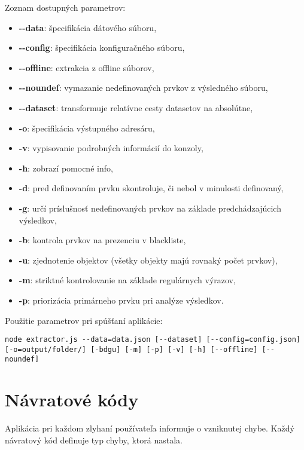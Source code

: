 Zoznam dostupných parametrov:

\begin{itemize}
    \item \textbf{-{}-data}: špecifikácia dátového súboru,
    \item \textbf{-{}-config}: špecifikácia konfiguračného súboru,
    \item \textbf{-{}-offline}: extrakcia z offline súborov,
    \item \textbf{-{}-noundef}: vymazanie nedefinovaných prvkov z výsledného súboru,
    \item \textbf{-{}-dataset}: transformuje relatívne cesty datasetov na absolútne,
    \item \textbf{-o}: špecifikácia výstupného adresáru,
    \item \textbf{-v}: vypisovanie podrobných informácií do konzoly,
    \item \textbf{-h}: zobrazí pomocné info,
    \item \textbf{-d}: pred definovaním prvku skontroluje, či nebol v minulosti definovaný,
    \item \textbf{-g}: určí príslušnosť nedefinovaných prvkov na základe predchádzajúcich výsledkov,
    \item \textbf{-b}: kontrola prvkov na prezenciu v blackliste,
    \item \textbf{-u}: zjednotenie objektov (všetky objekty majú rovnaký počet prvkov),
    \item \textbf{-m}: striktné kontrolovanie na základe regulárnych výrazov,
    \item \textbf{-p}: priorizácia primárneho prvku pri analýze výsledkov.
\end{itemize}

Použitie parametrov pri spúšťaní aplikácie:

\bigskip
\texttt{node extractor.js -{}-data=data.json  [-{}-dataset] [-{}-config=config.json]}\\
\texttt{[-o=output/folder/] [-bdgu] [-m] [-p] [-v] [-h] [-{}-offline] [-{}-noundef] }

\newpage

\section{Návratové kódy}

Aplikácia pri každom zlyhaní používateľa informuje o vzniknutej chybe. Každý návratový kód definuje typ chyby, ktorá nastala.

